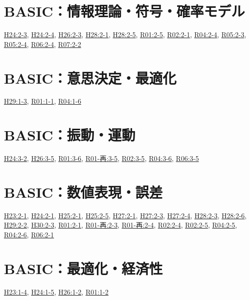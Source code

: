 \section{BASIC：情報理論・符号・確率モデル}
\hyperref[q:h24-reg-basic-2-3]{H24:2-3}, \hyperref[q:h24-reg-basic-2-4]{H24:2-4}, \hyperref[q:h26-reg-basic-2-3]{H26:2-3}, \hyperref[q:h28-reg-basic-2-1]{H28:2-1}, \hyperref[q:h28-reg-basic-2-5]{H28:2-5}, \hyperref[q:r01-reg-basic-2-5]{R01:2-5}, \hyperref[q:r02-reg-basic-2-1]{R02:2-1}, \hyperref[q:r04-reg-basic-2-4]{R04:2-4}, \hyperref[q:r05-reg-basic-2-3]{R05:2-3}, \hyperref[q:r05-reg-basic-2-4]{R05:2-4}, \hyperref[q:r06-reg-basic-2-4]{R06:2-4}, \hyperref[q:r07-reg-basic-2-2]{R07:2-2}
\section{BASIC：意思決定・最適化}
\hyperref[q:h29-reg-basic-1-3]{H29:1-3}, \hyperref[q:r01-reg-basic-1-1]{R01:1-1}, \hyperref[q:r04-reg-basic-1-6]{R04:1-6}
\section{BASIC：振動・運動}
\hyperref[q:h24-reg-basic-3-2]{H24:3-2}, \hyperref[q:h26-reg-basic-3-5]{H26:3-5}, \hyperref[q:r01-reg-basic-3-6]{R01:3-6}, \hyperref[q:r01-ret-basic-3-5]{R01-再:3-5}, \hyperref[q:r02-reg-basic-3-5]{R02:3-5}, \hyperref[q:r04-reg-basic-3-6]{R04:3-6}, \hyperref[q:r06-reg-basic-3-5]{R06:3-5}
\section{BASIC：数値表現・誤差}
\hyperref[q:h23-reg-basic-2-1]{H23:2-1}, \hyperref[q:h24-reg-basic-2-1]{H24:2-1}, \hyperref[q:h25-reg-basic-2-1]{H25:2-1}, \hyperref[q:h25-reg-basic-2-5]{H25:2-5}, \hyperref[q:h27-reg-basic-2-1]{H27:2-1}, \hyperref[q:h27-reg-basic-2-3]{H27:2-3}, \hyperref[q:h27-reg-basic-2-4]{H27:2-4}, \hyperref[q:h28-reg-basic-2-3]{H28:2-3}, \hyperref[q:h28-reg-basic-2-6]{H28:2-6}, \hyperref[q:h29-reg-basic-2-2]{H29:2-2}, \hyperref[q:h30-reg-basic-2-3]{H30:2-3}, \hyperref[q:r01-reg-basic-2-1]{R01:2-1}, \hyperref[q:r01-ret-basic-2-3]{R01-再:2-3}, \hyperref[q:r01-ret-basic-2-4]{R01-再:2-4}, \hyperref[q:r02-reg-basic-2-4]{R02:2-4}, \hyperref[q:r02-reg-basic-2-5]{R02:2-5}, \hyperref[q:r04-reg-basic-2-5]{R04:2-5}, \hyperref[q:r04-reg-basic-2-6]{R04:2-6}, \hyperref[q:r06-reg-basic-2-1]{R06:2-1}
\section{BASIC：最適化・経済性}
\hyperref[q:h23-reg-basic-1-4]{H23:1-4}, \hyperref[q:h24-reg-basic-1-5]{H24:1-5}, \hyperref[q:h26-reg-basic-1-2]{H26:1-2}, \hyperref[q:r01-reg-basic-1-2]{R01:1-2}
